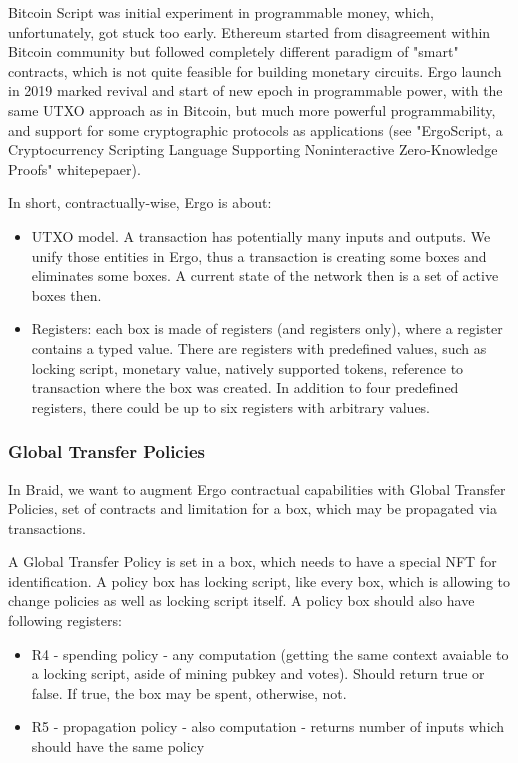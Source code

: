\documentclass{llncs}   %
\begin{document}
Bitcoin Script was initial experiment in programmable money, which, unfortunately, got stuck too early. Ethereum started from disagreement
within Bitcoin community but followed completely different paradigm of "smart" contracts, which is not quite feasible for building monetary circuits. Ergo launch in 2019 marked revival and start of new epoch in programmable power, with the same UTXO approach as in Bitcoin, but much more powerful programmability, and support for some cryptographic protocols as applications (see "ErgoScript, a Cryptocurrency Scripting Language Supporting Noninteractive Zero-Knowledge Proofs" whitepepaer).

In short, contractually-wise, Ergo is about:

\begin{itemize}
  \item UTXO model. A transaction has potentially many inputs and outputs. We unify those entities in Ergo, thus a transaction is creating some boxes and eliminates some boxes. A current state of the network then is a set of active boxes then.
  \item Registers: each box is made of registers (and registers only), where a register contains a typed value. There are registers with predefined values, such as locking script, monetary value, natively supported tokens, reference to transaction where the box was created. In addition to four predefined registers, there could be up to six registers with arbitrary values.
\end{itemize}

\subsubsection{Global Transfer Policies}

In Braid, we want to augment Ergo contractual capabilities with Global Transfer Policies, set of contracts and limitation for a box, which may be propagated via transactions.

A Global Transfer Policy is set in a box, which needs to have a special NFT for identification. A policy box has locking script, like every box, which is allowing to change policies as well as locking script itself. A policy box should also have following registers:

\begin{itemize} 
 \item R4 - spending policy - any computation (getting the same context avaiable to a locking script, aside of mining pubkey and votes). Should return true or false. If true, the box may be spent, otherwise, not. 
 \item R5 - propagation policy - also computation - returns number of inputs which should have the same policy
\end{itemize}
\end{document}
